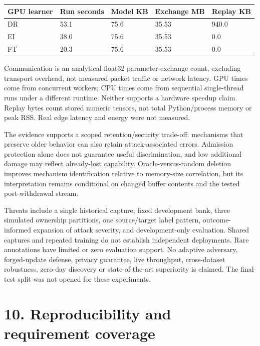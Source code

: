 \documentclass[
  10pt,
]{article}
\begin{document}
\begin{longtable}[]{@{}lllll@{}}
\toprule
GPU learner & Run seconds & Model KB & Exchange MB & Replay KB \\
\midrule
\endhead
DR & 53.1 & 75.6 & 35.53 & 940.0 \\
EI & 38.0 & 75.6 & 35.53 & 0.0 \\
FT & 20.3 & 75.6 & 35.53 & 0.0 \\
\bottomrule
\end{longtable}

Communication is an analytical float32 parameter-exchange count,
excluding transport overhead, not measured packet traffic or network
latency. GPU times come from concurrent workers; CPU times come from
sequential single-thread runs under a different runtime. Neither
supports a hardware speedup claim. Replay bytes count stored numeric
tensors, not total Python/process memory or peak RSS. Real edge latency
and energy were not measured.

The evidence supports a scoped retention/security trade-off: mechanisms
that preserve older behavior can also retain attack-associated errors.
Admission protection alone does not guarantee useful discrimination, and
low additional damage may reflect already-lost capability.
Oracle-versus-random deletion improves mechanism identification relative
to memory-size correlation, but its interpretation remains conditional
on changed buffer contents and the tested post-withdrawal stream.

Threats include a single historical capture, fixed development bank,
three simulated ownership partitions, one source/target label pattern,
outcome-informed expansion of attack severity, and development-only
evaluation. Shared captures and repeated training do not establish
independent deployments. Rare annotations have limited or zero
evaluation support. No adaptive adversary, forged-update defense,
privacy guarantee, live throughput, cross-dataset robustness, zero-day
discovery or state-of-the-art superiority is claimed. The final-test
split was not opened for these experiments.

\hypertarget{reproducibility-and-requirement-coverage}{%
\section{10. Reproducibility and requirement
coverage}\label{reproducibility-and-requirement-coverage}}
\end{document}

